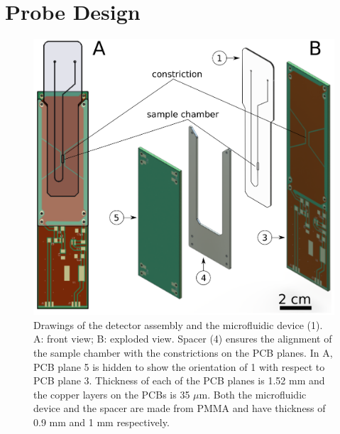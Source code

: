 \documentclass[preprint,5p]{elsarticle}
\begin{document}
\section{Probe Design}
\label{sec:probe-design}
\cbstart
\begin{figure}
\centering
\includegraphics[width=.8\linewidth,keepaspectratio=true]{./figures/ms5n17-tlp-im-190205-rf-device-assembly.png}
\caption{Drawings of the detector assembly and the microfluidic device (1). A: front view; B: exploded view. Spacer (4) ensures the alignment of the sample chamber with the constrictions on the PCB planes. In A, PCB plane 5 is hidden to show the orientation of 1 with respect to PCB plane 3. Thickness of each of the PCB planes is 1.52 mm and the copper layers on the PCBs is 35 $\mu$m. Both the microfluidic device and the spacer are made from PMMA and have thickness of 0.9 mm and 1 mm respectively.}
\label{fig:rf-device-assembly}
\end{figure}
\end{document}
